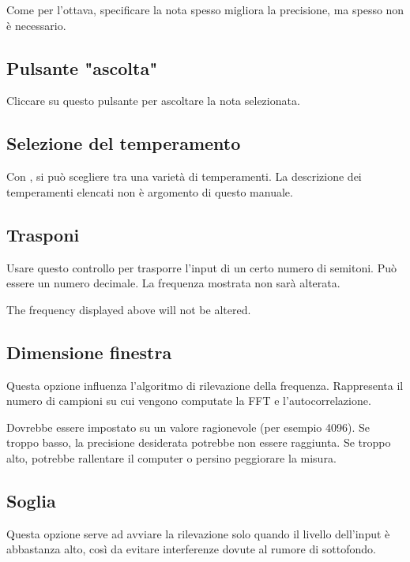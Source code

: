 Come per l'ottava, specificare la nota spesso migliora la precisione,
ma spesso non è necessario.

\subsection{Pulsante "ascolta"}\label{listen}

Cliccare su questo pulsante per ascoltare la nota selezionata.

\subsection{Selezione del temperamento}\label{temperament}

Con , si può scegliere tra una varietà di temperamenti.
La descrizione dei temperamenti elencati non è argomento di questo
manuale.

\subsection{Trasponi}\label{transpose}

Usare questo controllo per trasporre l'input di un certo numero
di semitoni. Può essere un numero decimale. La frequenza
mostrata non sarà alterata.

The frequency displayed above will not be altered.

\subsection{Dimensione finestra}\label{windowsize}

Questa opzione influenza l'algoritmo di rilevazione della frequenza.
Rappresenta il numero di campioni su cui vengono computate la FFT
e l'autocorrelazione.

Dovrebbe essere impostato su un valore ragionevole (per esempio 4096).
Se troppo basso, la precisione desiderata potrebbe non essere
raggiunta. Se troppo alto, potrebbe rallentare il computer o
persino peggiorare la misura.

\subsection{Soglia}\label{threshold}

Questa opzione serve ad avviare la rilevazione solo quando il livello
dell'input è abbastanza alto, così da evitare interferenze dovute al
rumore di sottofondo.

